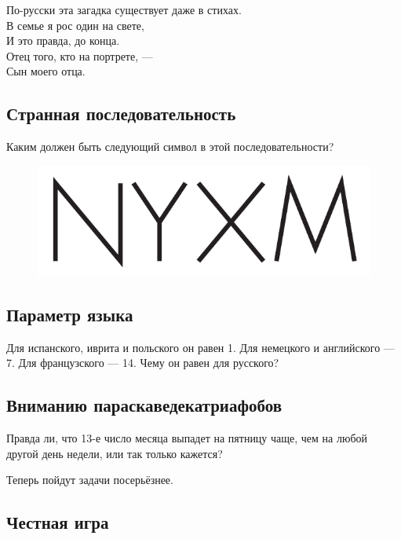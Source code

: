 \begin{addedbytheeditors}
По-русски эта загадка существует даже в стихах.\\ 
\quad В семье я рос один на свете,\\
\quad И это правда, до конца.\\
\quad Отец того, кто на портрете, ---\\
\quad Сын моего отца.
\end{addedbytheeditors}

\subsection*{Странная последовательность}

Каким должен быть следующий символ в этой последовательности?

\begin{figure}[h!]
\centering
\includegraphics[scale=0.5]{pics/ZYXW}
\end{figure}

\subsection*{Параметр языка}

Для испанского, иврита и польского он равен 1.
Для немецкого и английского --- 7.
Для французского --- 14.
Чему он равен для русского?

\subsection*{Вниманию параскаведекатриафобов}

Правда ли, что 13-е число месяца выпадет на пятницу чаще,
чем на любой другой день недели,
или так только кажется?



\medskip

Теперь пойдут задачи посерьёзнее.

\subsection*{Честная игра}

